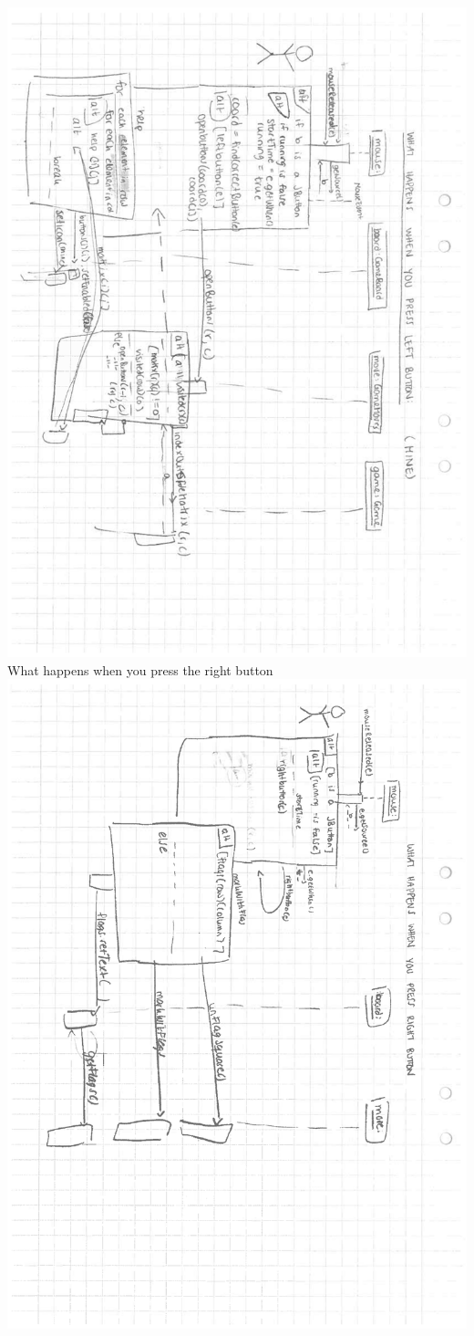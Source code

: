 \documentclass[12pt,twoside,a4paper]{article}
\begin{document}
\includegraphics[scale = 0.5, angle = 90]{seq2.pdf} \\
\newpage
What happens when you press the right button \\
\includegraphics[scale = 0.5, angle = 90]{seq1.pdf}
\end{document}
